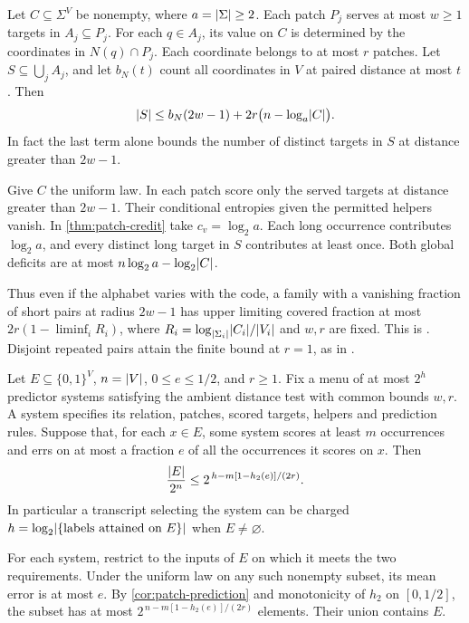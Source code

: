 \begin{corollary}
\label{prop:patch-coverage}
Let \(C\subseteq\Sigma^V\) be nonempty, where \(a=\lvert \Sigma\rvert\ge2\).
Each patch \(P_j\) serves at most \(w\ge1\) targets in \(A_j\subseteq P_j\).
For each \(q\in A_j\), its value on \(C\) is determined by the
coordinates in \(N(q)\cap P_j\). Each coordinate belongs to at most
\(r\) patches. Let \(S\subseteq\bigcup_j A_j\), and let \(b_N(t)\)
count all coordinates in \(V\) at paired distance at most \(t\).
Then
\[
 \lvert S\rvert\le b_N(2w-1)+2r\bigl(n-\log_a\lvert C\rvert\bigr).
\]
In fact the last term alone bounds the number of distinct targets in
\(S\) at distance greater than \(2w-1\).
\end{corollary}
\begin{outline}
Give \(C\) the uniform law. In each patch score only the served targets
at distance greater than \(2w-1\). Their conditional entropies given the
permitted helpers vanish. In \cref{thm:patch-credit} take
\(c_v=\log_2 a\). Each long occurrence contributes \(\log_2 a\), and
every distinct long target in \(S\) contributes at least once. Both
global deficits are at most \(n\log_2 a-\log_2\lvert C\rvert\).
\end{outline}

Thus even if the alphabet varies with the code, a family with a
vanishing fraction of short pairs at radius \(2w-1\) has upper
limiting covered fraction at most \(2r(1-\liminf_i R_i)\), where
\(R_i=\log_{\lvert \Sigma_i\rvert}\lvert C_i\rvert/\lvert V_i\rvert\) and \(w,r\)
are fixed. This is .
Disjoint repeated pairs attain the finite bound at \(r=1\), as in
.

\begin{corollary}\label{cor:patch-menu}
Let \(E\subseteq\{0,1\}^V\), \(n=\lvert V\rvert\), \(0\le e\le1/2\), and
\(r\ge1\). Fix a menu of at most \(2^h\) predictor systems satisfying
the ambient distance test with common bounds \(w,r\). A system specifies
its relation, patches, scored targets, helpers and prediction rules.
Suppose that, for each \(x\in E\), some system scores at least \(m\)
occurrences and errs on at most a fraction \(e\) of all the occurrences
it scores on \(x\). Then
\[
 \frac{\lvert E\rvert}{2^n}\le
 2^{\,h-m[1-h_2(e)]/(2r)}.
\]
In particular a transcript selecting the system can be charged
\(h=\log_2\lvert \{\text{labels attained on }E\}\rvert\) when \(E\ne\varnothing\).
\end{corollary}
\begin{outline}
For each system, restrict to the inputs of \(E\) on which it meets
the two requirements. Under the uniform law on any such nonempty subset,
its mean error is at most \(e\). By \cref{cor:patch-prediction} and
monotonicity of \(h_2\) on \([0,1/2]\), the subset has at most
\(2^{\,n-m[1-h_2(e)]/(2r)}\) elements. Their union contains \(E\).
\end{outline}

